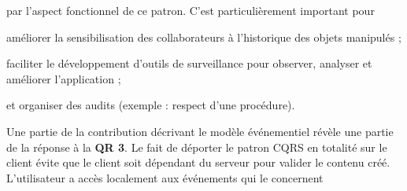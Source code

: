 par l'aspect fonctionnel de ce patron. C'est particulièrement important pour 
\begin{enumerate*}[label=(\roman*)]
	\item améliorer la sensibilisation des collaborateurs à l'historique des objets 
	manipulés ;
	\item faciliter le développement d'outils de surveillance pour observer, analyser 
	et améliorer l'application ;
	\item et organiser des audits (exemple : respect d'une procédure).
\end{enumerate*}
%

Une partie de la contribution décrivant le modèle événementiel révèle une partie de 
la réponse à la \textbf{QR 3}.
Le fait de déporter le patron \gls{CQRS} en totalité sur le client évite que le client 
soit dépendant du serveur pour valider le contenu créé. L'utilisateur a accès 
localement aux événements qui le concernent

%
%
%
%
%
%
%
%
%
%
%
